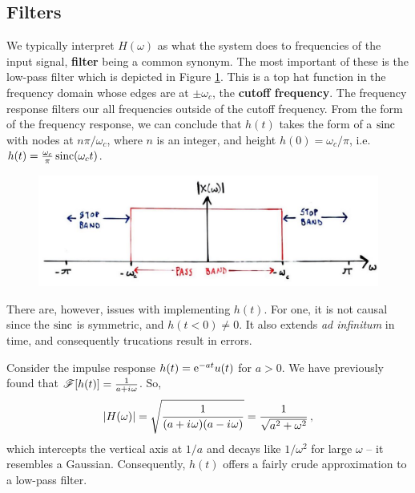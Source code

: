 \subsection{Filters}
%
We typically interpret $H(\omega)$ as what the system does to frequencies of the
input signal, \textbf{filter} being a common synonym. The most important of these
is the low-pass filter which is depicted in Figure \ref{fig::lecture_6_low_pass_filter}.
This is a top hat function in the frequency domain whose edges are at $\pm\omega_c$, the
\textbf{cutoff frequency}. The frequency response filters our all frequencies
outside of the cutoff frequency. From the form of the frequency response, we can
conclude that $h(t)$ takes the form of a $\operatorname{sinc}$ with nodes at $n\pi/\omega_c$, where
$n$ is an integer, and height $h(0) = \omega_c/\pi$, i.e.
$h(t) = \frac{\omega_c}{\pi}\operatorname{sinc}(\omega_c t)$.
%
\begin{figure}[H]
  \includegraphics[width=\textwidth]{images/lecture_6_low_pass_filter.JPG}
  \caption{
  }
  \label{fig::lecture_6_low_pass_filter}
\end{figure}
%
There are, however, issues with implementing $h(t)$. For one, it is not causal
since the $\operatorname{sinc}$ is symmetric, and $h(t<0) \neq 0$. It also extends
\textit{ad infinitum} in time, and consequently trucations result in errors.
%
\begin{exmp}
  Consider the impulse response $h(t) =\mathrm{e}^{-at}u(t)$ for $a>0$. We have previously
  found that $\mathscr{F}[h(t)] = \frac{1}{a + {i\mkern1mu}\omega}$. So,
  \begin{displaymath}
    |H(\omega)| = \sqrt{\frac{1}{(a + {i\mkern1mu}\omega)(a - {i\mkern1mu}\omega)}}
    = \frac{1}{\sqrt{a^2 + \omega^2}} \,,
  \end{displaymath}
  which intercepts the vertical axis at $1/a$ and decays like $1/\omega^2$ for
  large $\omega$ -- it resembles a Gaussian. Consequently, $h(t)$ offers
  a fairly crude approximation to a low-pass filter.
\end{exmp}

